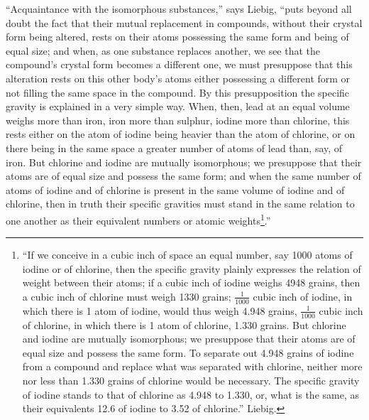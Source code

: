 \documentclass[12pt,a4paper]{book}
\begin{document}
``Acquaintance with the isomorphous substances,'' says Liebig, ``puts beyond
all doubt the fact that their mutual replacement in compounds, without their
crystal form being altered, rests on their atoms possessing the same form and
being of equal size; and when, as one substance replaces another, we see that
the compound's crystal form becomes a different one, we must presuppose that
this alteration rests on this other body's atoms either possessing a different
form or not filling the same space in the compound. By this presupposition the
specific gravity is explained in a very simple way. When, then, lead at an
equal volume weighs more than iron, iron more than sulphur, iodine more than
chlorine, this rests either on the atom of iodine being heavier than the atom
of chlorine, or on there being in the same space a greater number of atoms of
lead than, say, of iron. But chlorine and iodine are mutually isomorphous; we
presuppose that their atoms are of equal size and possess the same form; and
when the same number of atoms of iodine and of chlorine is present in the same
volume of iodine and of chlorine, then in truth their specific gravities must
stand in the same relation to one another as their equivalent numbers or
atomic weights\footnote{``If we conceive in a cubic inch of space an equal
number, say 1000 atoms of iodine or of chlorine, then the specific gravity
plainly expresses the relation of weight between their atoms; if a cubic inch
of iodine weighs 4948 grains, then a cubic inch of chlorine must weigh 1330
grains; $\frac{1}{1000}$ cubic inch of iodine, in which there is 1 atom of
iodine, would thus weigh 4.948 grains, $\frac{1}{1000}$ cubic inch of chlorine,
in which there is 1 atom of chlorine, 1.330 grains. But chlorine and iodine are
mutually isomorphous; we presuppose that their atoms are of equal size and
possess the same form. To separate out 4.948 grains of iodine from a compound
and replace what was separated with chlorine, neither more nor less than 1.330
grains of chlorine would be necessary. The specific gravity of iodine stands to
that of chlorine as 4.948 to 1.330, or, what is the same, as their equivalents
12.6 of iodine to 3.52 of chlorine.'' Liebig.}.''
\end{document}
